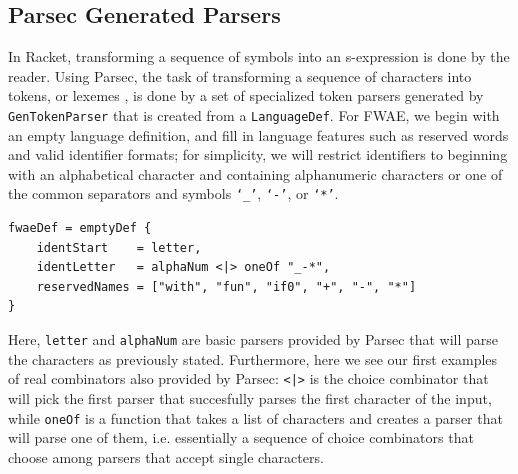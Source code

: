 \documentclass[format=acmlarge, review=false, nonacm=false, screen=true]{acmart}
\begin{document}
\subsection{Parsec Generated Parsers}\label{gentokenparser}
In Racket, transforming a sequence of symbols into an s-expression is done by the reader. Using Parsec, the task of transforming a sequence of characters into tokens, or lexemes \cite{lexical-analysis}, is done by a set of specialized token parsers generated by \texttt{GenTokenParser} that is created from a \texttt{LanguageDef}. For FWAE, we begin with an empty language definition, and fill in language features such as reserved words and valid identifier formats; for simplicity, we will restrict identifiers to beginning with an alphabetical character and containing alphanumeric characters or one of the common separators and symbols \texttt{`\_'}, \texttt{`-'}, or \texttt{`*'}.
\begin{verbatim}
fwaeDef = emptyDef {
    identStart    = letter,
    identLetter   = alphaNum <|> oneOf "_-*",
    reservedNames = ["with", "fun", "if0", "+", "-", "*"]
}
\end{verbatim}
Here, \texttt{letter} and \texttt{alphaNum} are basic parsers provided by Parsec that will parse the characters as previously stated. Furthermore, here we see our first examples of real combinators also provided by Parsec: \texttt{<|>} is the choice combinator that will pick the first parser that succesfully parses the first character of the input, while \texttt{oneOf} is a function that takes a list of characters and creates a parser that will parse one of them, i.e. essentially a sequence of choice combinators that choose among parsers that accept single characters.
\end{document}
